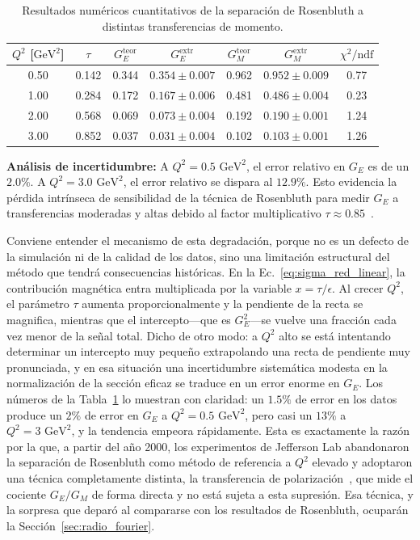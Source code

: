 \documentclass[10pt,a4paper]{article}
\begin{document}
\begin{table}[h]
\centering
\small
\caption{Resultados numéricos cuantitativos de la separación de Rosenbluth a distintas transferencias de momento.}
\label{tab:rosenbluth_results}
\begin{tabular}{ccccccc}
\toprule
$Q^2$ [$\text{GeV}^2$] & $\tau$ & $G_E^{\text{teor}}$ & $G_E^{\text{extr}}$ & $G_M^{\text{teor}}$ & $G_M^{\text{extr}}$ & $\chi^2/\text{ndf}$ \\
\midrule
0.50 & 0.142 & 0.344 & $0.354 \pm 0.007$ & 0.962 & $0.952 \pm 0.009$ & 0.77 \\
1.00 & 0.284 & 0.172 & $0.167 \pm 0.006$ & 0.481 & $0.486 \pm 0.004$ & 0.23 \\
2.00 & 0.568 & 0.069 & $0.073 \pm 0.004$ & 0.192 & $0.190 \pm 0.001$ & 1.24 \\
3.00 & 0.852 & 0.037 & $0.031 \pm 0.004$ & 0.102 & $0.103 \pm 0.001$ & 1.26 \\
\bottomrule
\end{tabular}
\end{table}

\textbf{Análisis de incertidumbre:} A $Q^2 = 0.5\text{ GeV}^2$, el error relativo en $G_E$ es de un $2.0\%$. A $Q^2 = 3.0\text{ GeV}^2$, el error relativo se dispara al $12.9\%$. Esto evidencia la pérdida intrínseca de sensibilidad de la técnica de Rosenbluth para medir $G_E$ a transferencias moderadas y altas debido al factor multiplicativo $\tau \approx 0.85$~\cite{arrington2007,perdrisat2007}.

Conviene entender el mecanismo de esta degradación, porque no es un defecto de la simulación ni de la calidad de los datos, sino una limitación estructural del método que tendrá consecuencias históricas. En la Ec.~\eqref{eq:sigma_red_linear}, la contribución magnética entra multiplicada por la variable $x = \tau/\epsilon$. Al crecer $Q^2$, el parámetro $\tau$ aumenta proporcionalmente y la pendiente de la recta se magnifica, mientras que el intercepto---que es $G_E^2$---se vuelve una fracción cada vez menor de la señal total. Dicho de otro modo: a $Q^2$ alto se está intentando determinar un intercepto muy pequeño extrapolando una recta de pendiente muy pronunciada, y en esa situación una incertidumbre sistemática modesta en la normalización de la sección eficaz se traduce en un error enorme en $G_E$. Los números de la Tabla~\ref{tab:rosenbluth_results} lo muestran con claridad: un $1.5\%$ de error en los datos produce un $2\%$ de error en $G_E$ a $Q^2 = 0.5\text{ GeV}^2$, pero casi un $13\%$ a $Q^2 = 3\text{ GeV}^2$, y la tendencia empeora rápidamente. Esta es exactamente la razón por la que, a partir del año 2000, los experimentos de Jefferson Lab abandonaron la separación de Rosenbluth como método de referencia a $Q^2$ elevado y adoptaron una técnica completamente distinta, la transferencia de polarización~\cite{jones2000,punjabi2005,gayou2002}, que mide el cociente $G_E/G_M$ de forma directa y no está sujeta a esta supresión. Esa técnica, y la sorpresa que deparó al compararse con los resultados de Rosenbluth, ocuparán la Sección~\ref{sec:radio_fourier}.
\end{document}
